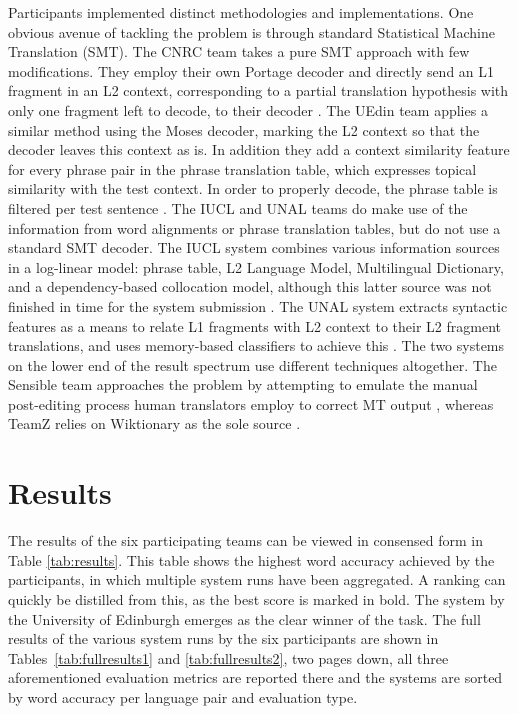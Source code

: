 Participants implemented distinct methodologies and implementations. One
obvious avenue of tackling the problem is through standard Statistical Machine
Translation (SMT). The CNRC team takes a pure SMT approach with few
modifications. They employ their own Portage decoder and directly send an L1
fragment in an L2 context, corresponding to a partial translation hypothesis
with only one fragment left to decode, to their decoder \citep{CNRC}. The UEdin
team applies a similar method using the Moses decoder, marking the L2 context
so that the decoder leaves this context as is. In addition they add a context
similarity feature for every phrase pair in the phrase translation table, which
expresses topical similarity with the test context. In order to properly
decode, the phrase table is filtered per test sentence \citep{UEDIN}. The IUCL
and UNAL teams do make use of the information from word alignments or phrase
translation tables, but do not use a standard SMT decoder. The IUCL system
combines various information sources in a log-linear model: phrase table, L2
Language Model, Multilingual Dictionary, and a dependency-based collocation
model, although this latter source was not finished in time for the system
submission \citep{IUCL}. The UNAL system extracts syntactic features as a means
to relate L1 fragments with L2 context to their L2 fragment translations, and
uses memory-based classifiers to achieve this \citep{UNAL}. The two systems on
the lower end of the result spectrum use different techniques altogether. The
Sensible team approaches the problem by attempting to emulate the manual
post-editing process human translators employ to correct MT output
\citep{SENSIBLE},
whereas TeamZ relies on Wiktionary as the sole source \citep{TEAMZ}.


\section{Results}

The results of the six participating teams can be viewed in consensed form in
Table \ref{tab:results}. This table shows the highest word accuracy achieved by
the participants, in which multiple system runs have been aggregated. A ranking
can quickly be distilled from this, as the best score is marked in bold. The
system by the University of Edinburgh emerges as the clear winner of the task.
The full results of the various system runs by the six participants are shown
in Tables~\ref{tab:fullresults1} and \ref{tab:fullresults2}, two pages down,
all three aforementioned evaluation metrics are reported there and the systems
are sorted by word accuracy per language pair and evaluation type.


